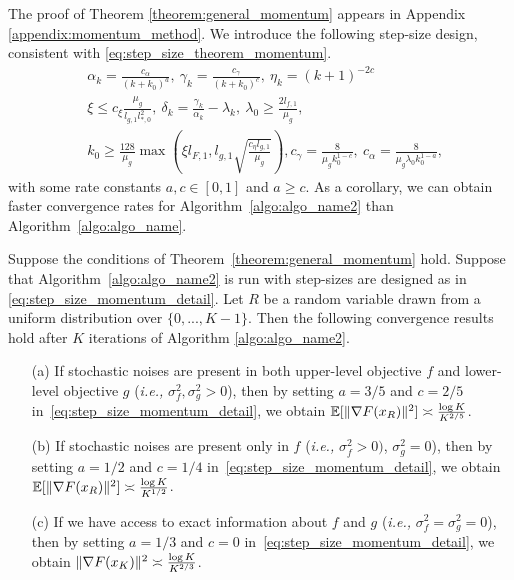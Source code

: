 The proof of Theorem \ref{theorem:general_momentum} appears in Appendix \ref{appendix:momentum_method}. 
We introduce the following  step-size design, consistent with \eqref{eq:step_size_theorem_momentum}.
\begin{subequations}
    \label{eq:step_size_momentum_detail}
    \begin{align}
        &\alpha_k = \frac{c_\alpha}{(k+k_0)^a}, \ \gamma_k = \frac{c_\gamma}{(k+k_0)^c}, \ \eta_{k} = (k+1)^{-2c} \\
        &\xi \le c_\xi \frac{\mu_g}{l_{g,1} l_{*,0}^2}, \ \delta_k = \frac{\gamma_k}{\alpha_k} - \lambda_k, \ \lambda_0 \ge \frac{2l_{f,1}}{\mu_g}, \\
        &k_0 \ge \frac{128}{\mu_g} \max\left(\xi l_{F,1}, l_{g,1} \sqrt{\frac{c_\eta l_{g,1}}{\mu_g}} \right), c_\gamma = \frac{8}{\mu_g k_0^{1-c}}, \ c_\alpha = \frac{8}{\mu_g \lambda_0 k_0^{1-a}},
    \end{align}
\end{subequations}
with some rate constants $a,c \in [0,1]$ and $a \ge c$. As a corollary, we can obtain faster convergence rates for Algorithm~\ref{algo:algo_name2} than Algorithm~\ref{algo:algo_name}. 
\begin{corollary}
    \label{corollary:non_convex_momentum}
   Suppose the conditions of Theorem~\ref{theorem:general_momentum} hold.
   Suppose that Algorithm~\ref{algo:algo_name2} is run with step-sizes are designed as in \eqref{eq:step_size_momentum_detail}. Let $R$ be a random variable drawn from a uniform distribution over $\{0, ..., K-1\}$.
   Then the following convergence results hold after $K$ iterations of Algorithm \ref{algo:algo_name2}.
    \begin{enumerate}
        \item[(a)]  If stochastic noises are present in both upper-level objective $f$ and lower-level objective $g$ ({\it i.e.,} $\sigma_f^2, \sigma_g^2 > 0$), then by setting $a=3/5$ and $c=2/5$ in~\eqref{eq:step_size_momentum_detail}, we obtain 
        $\mathbb{E}[\|\nabla F(x_R) \|^2] \asymp \frac{\log K}{K^{2/5}}$.
        \item[(b)] If stochastic noises are present only in $f$ ({\it i.e.,} $\sigma_f^2 > 0)$, $\sigma_g^2 = 0$), then by setting $a = 1/2$ and $c=1/4$ in~\eqref{eq:step_size_momentum_detail}, we obtain $\mathbb{E}[\|\nabla F(x_R)\|^2] \asymp \frac{\log K}{K^{1/2}}$.
        \item[(c)] If we have access to exact information about $f$ and $g$ ({\it i.e.,} $\sigma_f^2 = \sigma_g^2 = 0$), then by setting $a = 1/3$ and $c = 0$ in~\eqref{eq:step_size_momentum_detail}, we obtain $\|\nabla F(x_K)\|^2 \asymp \frac{\log K}{K^{2/3}}$.
    \end{enumerate}
\end{corollary}
